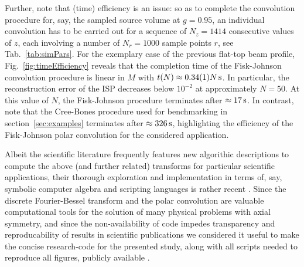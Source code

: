 \documentclass[12pt]{iopart}
\begin{document}
Further, note that (time) efficiency is an issue: so as to complete the
convolution procedure for, say, the sampled source volume at $g=0.95$, an
individual convolution has to be carried out for a sequence of $N_z=1414$
consecutive values of $z$, each involving a number of $N_r=1000$ sample points
$r$, see Tab.~\ref{tab:simPars}. For the exemplary case of the previous
flat-top beam profile, Fig.~\ref{fig:timeEfficiency} reveals that the
completion time of the Fisk-Johnson convolution procedure is linear in $M$ with
$t(N)\approx 0.34(1) N \,{\rm{s}}$. In particular, the reconstruction
error of the ISP decreases below $10^{-2}$ at approximately $N=50$. At this
value of $N$, the Fisk-Johnson procedure terminates after $\approx
17\,{\rm{s}}$.  In contrast, note that the Cree-Bones procedure used for
benchmarking in section~\ref{sec:examples} terminates after $\approx
326\,{\rm{s}}$, highlighting the efficiency of the Fisk-Johnson polar
convolution for the considered application. 

Albeit the scientific literature frequently features new algorithic
descriptions to compute the above (and further related) transforms for
particular scientific applications, their thorough exploration and
implementation in terms of, say, symbolic computer algebra and scripting
languages is rather recent \cite{Dovlo:2015,Baddour:2017}.  Since the discrete
Fourier-Bessel transform and the polar convolution are valuable computational
tools for the solution of many physical problems with axial symmetry, and since
the non-availability of code impedes transparency and reproducability of
results in scientific publications \cite{Barnes:2010,Ince:2012,Sandve:2013} we
considered it useful to make the concise research-code for the presented study,
along with all scripts needed to reproduce all figures, publicly available
\cite{Melchert_gitHub_dFBT:2016}.



\appendix
\end{document}
